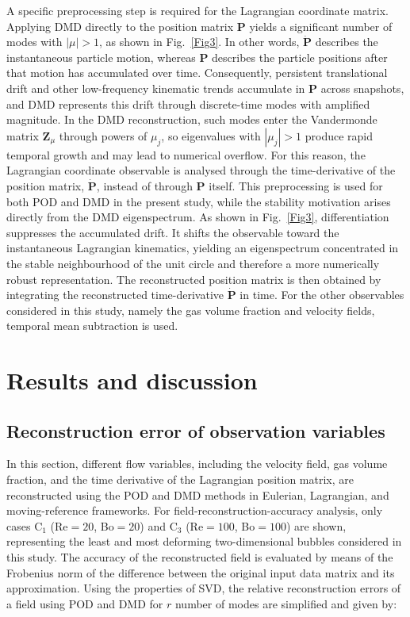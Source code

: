 \documentclass[a4paper,fleqn]{cas-sc}
\begin{document}
	A specific preprocessing step is required for the Lagrangian coordinate matrix. Applying DMD directly to the position matrix $\mathbf{P}$ yields a significant number of modes with $|\mu|>1$, as shown in Fig.~\ref{Fig3}. In other words, $\dot{\mathbf{P}}$ describes the instantaneous particle motion, whereas $\mathbf{P}$ describes the particle positions after that motion has accumulated over time. Consequently, persistent translational drift and other low-frequency kinematic trends accumulate in $\mathbf{P}$ across snapshots, and DMD represents this drift through discrete-time modes with amplified magnitude. In the DMD reconstruction, such modes enter the Vandermonde matrix $\mathbf{Z}_{\mu}$ through powers of $\mu_j$, so eigenvalues with $|\mu_j|>1$ produce rapid temporal growth and may lead to numerical overflow. For this reason, the Lagrangian coordinate observable is analysed through the time-derivative of the position matrix, $\dot{\mathbf{P}}$, instead of through $\mathbf{P}$ itself. This preprocessing is used for both POD and DMD in the present study, while the stability motivation arises directly from the DMD eigenspectrum. As shown in Fig.~\ref{Fig3}, differentiation suppresses the accumulated drift. It shifts the observable toward the instantaneous Lagrangian kinematics, yielding an eigenspectrum concentrated in the stable neighbourhood of the unit circle and therefore a more numerically robust representation. The reconstructed position matrix is then obtained by integrating the reconstructed time-derivative $\dot{\mathbf{P}}$ in time. For the other observables considered in this study, namely the gas volume fraction and velocity fields, temporal mean subtraction is used.
	
	\section{Results and discussion}
	\label{Results and discussion}
	
	
	\subsection{Reconstruction error of observation variables}
	
	In this section, different flow variables, including the velocity field, gas volume fraction, and the time derivative of the Lagrangian position matrix, are reconstructed using the POD and DMD methods in Eulerian, Lagrangian, and moving-reference frameworks. For field-reconstruction-accuracy analysis, only cases C$_1$ (Re$=20$, Bo$=20$) and C$_3$ (Re$=100$, Bo$=100$) are shown, representing the least and most deforming two-dimensional bubbles considered in this study. The accuracy of the reconstructed field is evaluated by means of the Frobenius norm of the difference between the original input data matrix and its approximation. Using the properties of SVD, the relative reconstruction errors of a field using POD and DMD for $r$ number of modes are simplified and given by:
	
\end{document}
